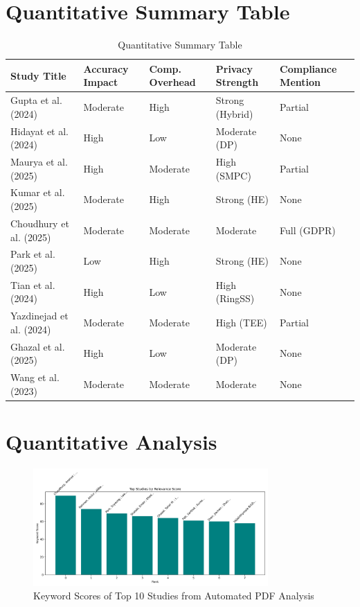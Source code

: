 \documentclass[12pt]{report}
\begin{document}
\section{Quantitative Summary Table}
\begin{table}[h]
    \centering
    \begin{tabular}{|p{4cm}|p{2.5cm}|p{2.5cm}|p{2.5cm}|p{2.5cm}|}
        \hline
        \textbf{Study Title} & \textbf{Accuracy Impact} & \textbf{Comp. Overhead} & \textbf{Privacy Strength} & \textbf{Compliance Mention} \\
        \hline
        Gupta et al. (2024) & Moderate & High & Strong (Hybrid) & Partial \\
        Hidayat et al. (2024) & High & Low & Moderate (DP) & None \\
        Maurya et al. (2025) & High & Moderate & High (SMPC) & Partial \\
        Kumar et al. (2025) & Moderate & High & Strong (HE) & None \\
        Choudhury et al. (2025) & Moderate & Moderate & Moderate & Full (GDPR) \\
        Park et al. (2025) & Low & High & Strong (HE) & None \\
        Tian et al. (2024) & High & Low & High (RingSS) & None \\
        Yazdinejad et al. (2024) & Moderate & Moderate & High (TEE) & Partial \\
        Ghazal et al. (2025) & High & Low & Moderate (DP) & None \\
        Wang et al. (2023) & Moderate & Moderate & Moderate & None \\
        \hline
    \end{tabular}
    \caption{Quantitative Summary Table}
    \label{tab:quant_summary}
\end{table}

\section{Quantitative Analysis}
\begin{figure}[h]
    \centering
    \includegraphics[width=0.8\textwidth]{keyword_scores.png}
    \caption{Keyword Scores of Top 10 Studies from Automated PDF Analysis}
    \label{fig:scores_plot}
\end{figure}
\end{document}
